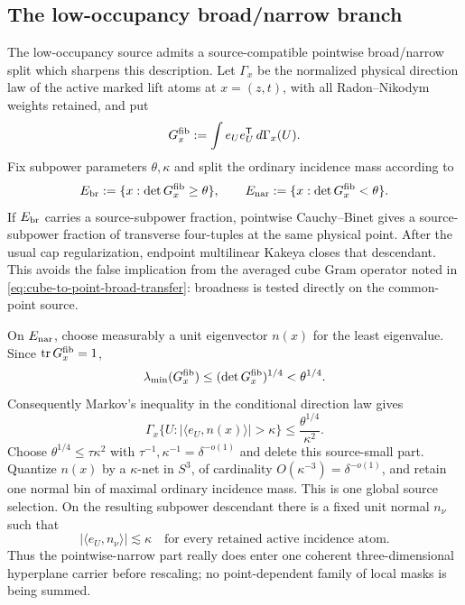 \documentclass[11pt]{article}
\begin{document}
\subsection{The low-occupancy broad/narrow branch}

The low-occupancy source admits a source-compatible pointwise broad/narrow
split which sharpens this description.  Let \(\Gamma_x\) be the normalized
physical direction law of the active marked lift atoms at \(x=(z,t)\), with
all Radon--Nikodym weights retained, and put
\begin{equation}\label{eq:low-occupancy-pointwise-gram}
 G_x^{\rm fib}:=\int e_Ue_U^{\mathsf T}\,d\Gamma_x(U).
\end{equation}
Fix subpower parameters \(\theta,\kappa\) and split the ordinary
incidence mass according to
\begin{equation}\label{eq:low-occupancy-pointwise-broad-narrow}
 E_{\rm br}:=\{x:\det G_x^{\rm fib}\ge\theta\},
 \qquad
 E_{\rm nar}:=\{x:\det G_x^{\rm fib}<\theta\}.
\end{equation}
If \(E_{\rm br}\) carries a source-subpower fraction, pointwise
Cauchy--Binet gives a source-subpower fraction of transverse four-tuples at
the same physical point.  After the usual cap regularization, endpoint
multilinear Kakeya closes that descendant.  This avoids the false implication
from the averaged cube Gram operator noted in
\eqref{eq:cube-to-point-broad-transfer}: broadness is tested directly on
the common-point source.

On \(E_{\rm nar}\), choose measurably a unit eigenvector \(n(x)\) for
the least eigenvalue.  Since \(\operatorname{tr}G_x^{\rm fib}=1\),
\[
 \lambda_{\min}(G_x^{\rm fib})
 \le(\det G_x^{\rm fib})^{1/4}
 <\theta^{1/4}.
\]
Consequently Markov's inequality in the conditional direction law gives
\begin{equation}\label{eq:pointwise-normal-direction-pruning}
 \Gamma_x\{U:|\langle e_U,n(x)\rangle|>\kappa\}
 \le\frac{\theta^{1/4}}{\kappa^2}.
\end{equation}
Choose \(\theta^{1/4}\le\tau\kappa^2\) with
\(\tau^{-1},\kappa^{-1}=\delta^{-o(1)}\) and delete this
source-small part.  Quantize \(n(x)\) by a \(\kappa\)-net in
\(S^3\), of cardinality \(O(\kappa^{-3})=\delta^{-o(1)}\), and
retain one normal bin of maximal ordinary incidence mass.  This is one global
source selection.  On the resulting subpower descendant there is a fixed
unit normal \(n_\nu\) such that
\begin{equation}\label{eq:coherent-fixed-hyperplane-descendant}
 |\langle e_U,n_\nu\rangle|
 \lesssim\kappa
 \quad\text{for every retained active incidence atom.}
\end{equation}
Thus the pointwise-narrow part really does enter one coherent
three-dimensional hyperplane carrier before rescaling; no point-dependent
family of local masks is being summed.
\end{document}
